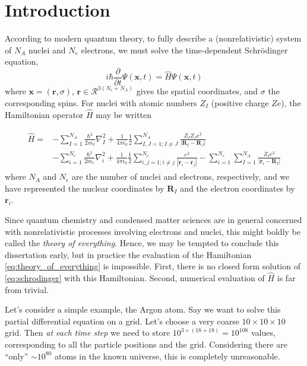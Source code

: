 \chapter{Introduction}
\label{chap:intro}

According to modern quantum theory, to fully describe a (nonrelativistic) system of $N_A$ nuclei and $N_e$ electrons, we must solve the time-dependent Schr\"odinger equation,
\begin{equation}
    \label{eq:schrodinger}
    i \hbar \frac{\partial}{\partial t} \Psi(\bm{x}, t)
    = \hat{H} \Psi(\bm{x}, t)
\end{equation}
where $\bm x=(\bm{r}, \sigma)$, $\bm r\in\mathcal{R}^{3(N_e+N_A)}$ gives the spatial coordinates, and $\sigma$ the corresponding spins. For nuclei with atomic numbers $Z_I$ (positive charge $Ze$), the Hamiltonian operator $\hat H$ may be written

\begin{align}
\begin{split}
\label{eq:theory_of_everything}
\hat H =& -\sum_{I=1}^{N_A}\frac{\hbar^2}{2m_I} \nabla^2_I
+ \frac 1{4\pi\epsilon_0} \frac 12\sum_{I,J=1;I\neq J}^{N_A} \frac{Z_IZ_Je^2}{|\bm R_I-\bm R_J|} \\
&- \sum_{i=1}^{N_e} \frac{\hbar^2}{2m_e} \nabla^2_i
+ \frac 1{4\pi\epsilon_0} \frac 12\sum_{i,j=1;i\neq j}^{N_e} \frac{e^2}{|\bm r_i-\bm r_j|}
- \sum_{i=1}^{N_e} \sum_{I=1}^{N_A} \frac{Z_I e^2}{|\bm r_i-\bm R_I|}
\end{split}
\end{align}
where $N_A$ and $N_e$ are the number of nuclei and electrons, respectively, and we have represented the nuclear coordinates by $\bm R_I$ and the electron coordinates by $\bm r_i$.

Since quantum chemistry and condensed matter sciences are in general concerned with nonrelativistic processes involving electrons and nuclei, this might boldly be called the \emph{theory of everything}.\cite{laughlinTheory2000} Hence, we may be tempted to conclude this dissertation early, but in practice the evaluation of the Hamiltonian \eqref{eq:theory_of_everything} is impossible. First, there is no closed form solution of \eqref{eq:schrodinger} with this Hamiltonian. Second, numerical evaluation of $\hat H$ is far from trivial.

Let's consider a simple example, the Argon atom. Say we want to solve this partial differential equation on a grid. Let's choose a very coarse $10\times 10\times 10$ grid. Then \emph{at each time step} we need to store $10^{3\times (18+18)}=10^{108}$ values, corresponding to all the particle positions and the grid. Considering there are ``only'' $\sim 10^{80}$ atoms in the known universe,\cite{rydenIntroduction2017} this is completely unreasonable.


